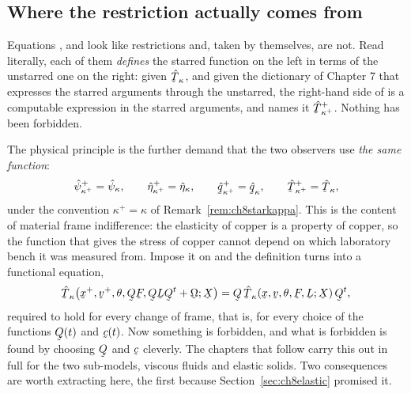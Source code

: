 \subsection*{Where the restriction actually comes from}

Equations ,  and  look like restrictions
and, taken by themselves, are not. Read literally, each of them
\emph{defines} the starred function on the left in terms of the unstarred
one on the right: given $\hat\bT_{\kappa}$, and given the dictionary of
Chapter 7 that expresses the starred arguments through the unstarred, the
right-hand side of  is a computable expression in the starred
arguments, and  names it $\hat\bT^{+}_{\kappa^{+}}$. Nothing
has been forbidden.

The physical principle is the further demand that the two observers use
\emph{the same function}:
\[
   \hat\psi^{+}_{\kappa^{+}}=\hat\psi_{\kappa},\qquad
   \hat\eta^{+}_{\kappa^{+}}=\hat\eta_{\kappa},\qquad
   \hat\bq^{+}_{\kappa^{+}}=\hat\bq_{\kappa},\qquad
   \hat\bT^{+}_{\kappa^{+}}=\hat\bT_{\kappa},
\]
under the convention $\kappa^{+}=\kappa$ of
Remark~\ref{rem:ch8starkappa}. This is the content of material frame
indifference: the elasticity of copper is a property of copper, so the
function that gives the stress of copper cannot depend on which
laboratory bench it was measured from. Impose it on  and the
definition turns into a functional equation,
\[
   \hat\bT_{\kappa}\big(\bx^{+},\bv^{+},\theta,\bQ\bF,
     \bQ\bL\bQ^{t}+\bOm;\bX\big)
   =\bQ\,\hat\bT_{\kappa}(\bx,\bv,\theta,\bF,\bL;\bX)\,\bQ^{t},
\]
required to hold for every change of frame, that is, for every choice of
the functions $\bQ(t)$ and $\bc(t)$. Now something is forbidden, and
what is forbidden is found by choosing $\bQ$ and $\bc$ cleverly.
The chapters that follow carry this out in full for the two sub-models,
viscous fluids and elastic solids. Two
consequences are worth extracting here, the first because
Section~\ref{sec:ch8elastic} promised it.

